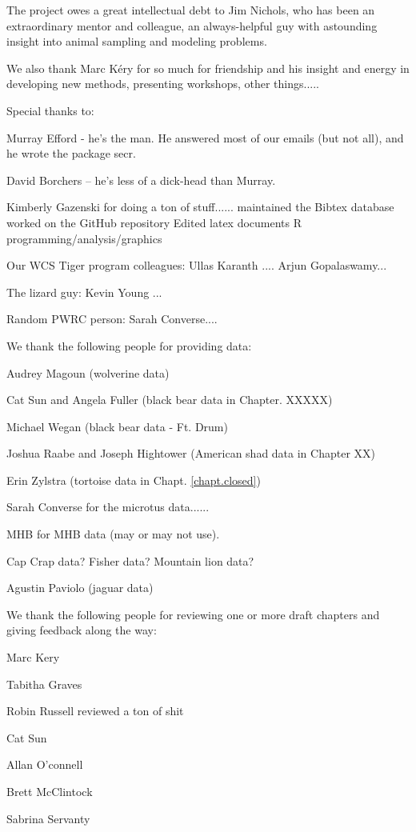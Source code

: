 The project owes a great intellectual debt to Jim Nichols, who has
been an extraordinary mentor and colleague, an always-helpful guy with
astounding insight into animal sampling and modeling problems. 

We also thank Marc K\'{e}ry for so much for friendship and his insight
and energy in developing new methods, presenting workshops, other things.....


Special thanks to:

Murray Efford - he's the man. He answered most of our emails (but not
all), and he wrote the package secr.

David Borchers -- he's less of a dick-head than Murray.

Kimberly Gazenski for doing a ton of stuff......
maintained the Bibtex database
worked on the GitHub repository
Edited latex documents
R programming/analysis/graphics

Our WCS Tiger program colleagues:
Ullas Karanth ....
Arjun Gopalaswamy...

The lizard guy:
Kevin Young ...

Random PWRC person:
Sarah Converse....



We thank the following people for providing data:

Audrey Magoun (wolverine data)

Cat Sun and Angela Fuller (black bear data in Chapter. XXXXX)

Michael Wegan (black bear data - Ft. Drum)

Joshua Raabe and Joseph Hightower (American shad data in Chapter XX)

Erin Zylstra (tortoise data in Chapt. \ref{chapt.closed})

Sarah Converse for the microtus data......

MHB for MHB data (may or may not use).

Cap Crap data? Fisher data?  Mountain lion data?

Agustin Paviolo (jaguar data)


We thank the following people for reviewing one or more draft chapters
and giving feedback along the way:

Marc Kery

Tabitha Graves

Robin Russell reviewed a ton of shit

Cat Sun

Allan O'connell

Brett McClintock

Sabrina Servanty



